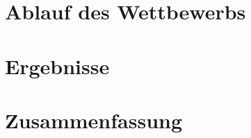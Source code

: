 \documentclass{article}
\begin{document}
\section{Ablauf des Wettbewerbs}



\section{Ergebnisse}


\section{Zusammenfassung}







\end{document}
